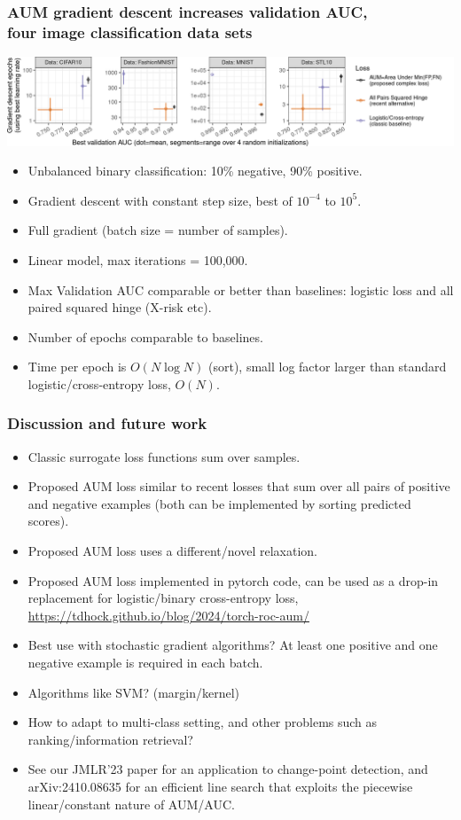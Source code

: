 \documentclass[t]{beamer}
\begin{document}
\begin{frame}
  \frametitle{AUM gradient descent increases validation AUC,\\
    four image classification data sets}
 
\includegraphics[width=\textwidth]{data_Classif_batchtools_best_valid_scatter}

\begin{itemize}
\item Unbalanced binary classification: 10\% negative, 90\% positive.
\item Gradient descent with constant step size, best of $10^{-4}$ to $10^5$.
\item Full gradient (batch size = number of samples).
\item Linear model, max iterations = 100,000.
\item Max Validation AUC comparable or better than baselines: logistic loss and all paired squared hinge (X-risk etc).
\item Number of epochs comparable to baselines.
\item Time per epoch is $O(N \log N)$ (sort), small log factor larger than standard logistic/cross-entropy loss, $O(N)$.
\end{itemize}

\end{frame}

\begin{frame}
  \frametitle{Discussion and future work}
  \begin{itemize}
  \item Classic surrogate loss functions sum over samples.
  \item Proposed AUM loss similar to recent losses that sum over all
    pairs of positive and negative examples (both can be implemented
    by sorting predicted scores).
  \item Proposed AUM loss uses a
    different/novel relaxation.
  \item Proposed AUM loss implemented in pytorch code, can be used as a drop-in replacement for logistic/binary cross-entropy loss, \url{https://tdhock.github.io/blog/2024/torch-roc-aum/}
  \item Best use with stochastic gradient algorithms?
    At least one positive and one negative example is required in each
    batch.
  \item Algorithms like SVM? (margin/kernel)
  \item How to adapt to multi-class setting, and other problems such as
    ranking/information retrieval?
  \item See our JMLR'23 paper for an application to change-point detection, and arXiv:2410.08635 for an efficient line search that exploits the piecewise linear/constant nature of AUM/AUC.
  \end{itemize}
\end{frame}
\end{document}
